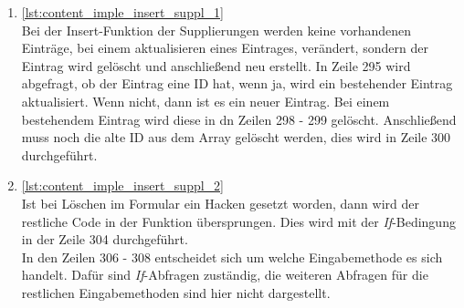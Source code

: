 \begin{enumerate}
\item \autoref{lst:content_imple_insert_suppl_1}\\
Bei der Insert-Funktion der Supplierungen werden keine vorhandenen Einträge, bei einem aktualisieren eines Eintrages, verändert, sondern der Eintrag wird gelöscht und anschließend neu erstellt. In Zeile 295 wird abgefragt, ob der Eintrag eine ID hat, wenn ja, wird ein bestehender Eintrag aktualisiert. Wenn nicht, dann ist es ein neuer Eintrag. Bei einem bestehendem Eintrag wird diese in dn Zeilen 298 - 299 gelöscht. Anschließend muss noch die alte ID aus dem Array gelöscht werden, dies wird in Zeile 300 durchgeführt. 



\item \autoref{lst:content_imple_insert_suppl_2}\\
Ist bei Löschen im Formular ein Hacken gesetzt worden, dann wird der restliche Code in der Funktion übersprungen. Dies wird mit der \textit{If}-Bedingung in der Zeile 304 durchgeführt.\\
In den Zeilen 306 - 308 entscheidet sich um welche Eingabemethode es sich handelt. Dafür sind \textit{If}-Abfragen zuständig, die weiteren Abfragen für die restlichen Eingabemethoden sind hier nicht dargestellt.




\end{enumerate}
